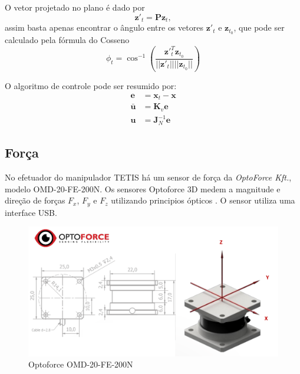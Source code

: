 O vetor projetado no plano é dado por
\begin{equation}
\bm{z'}_{t} = \bm{P} \bm{z}_{t},
\end{equation}
assim basta apenas encontrar o ângulo entre os vetores $\bm{z'}_{t}$ e $\bm{z}_{t_0}$, que pode ser calculado pela fórmula do Cosseno \cite{strang} 
\begin{equation}
\phi_t = \cos^{-1} \left( \frac{\bm{z'}^T_{t} \bm{z}_{t_0} } {||\bm{z'}_{t}|| ||\bm{z}_{t_0}||} \right)
\end{equation}




O algoritmo de controle pode ser resumido por:
\begin{align}
\bm{e} &= \bm{x}_t - \bm{x} \\
\bm{\bar{u}} &= \bm{K}_v \bm{e}  \\
\bm{u} &= \bm{J}_N^{-1} \bm{e}
\end{align}

\subsection{Força}
No efetuador do manipulador TETIS há um sensor de força da \textit{OptoForce Kft.}, modelo OMD-20-FE-200N. Os sensores Optoforce 3D medem a magnitude e direção de forças $F_x$, $F_y$ e $F_z$ utilizando principios ópticos \cite{optoforce}. O sensor utiliza uma interface USB. 

\begin{figure}[!ht]
\centering
  \includegraphics[width=\linewidth]{./img/optoforce.png}
  \caption{Optoforce OMD-20-FE-200N \cite{optoforce}}
  \label{fig:optoforce}
\end{figure}%

